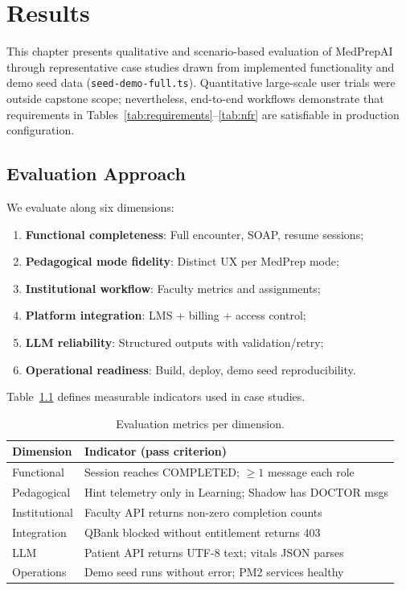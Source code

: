 \chapter{Results}
\label{ch:results}

This chapter presents qualitative and scenario-based evaluation of MedPrepAI through representative case studies drawn from implemented functionality and demo seed data (\texttt{seed-demo-full.ts}). Quantitative large-scale user trials were outside capstone scope; nevertheless, end-to-end workflows demonstrate that requirements in Tables~\ref{tab:requirements}--\ref{tab:nfr} are satisfiable in production configuration.

\section{Evaluation Approach}
We evaluate along six dimensions:
\begin{enumerate}
  \item \textbf{Functional completeness}: Full encounter, SOAP, resume sessions;
  \item \textbf{Pedagogical mode fidelity}: Distinct UX per MedPrep mode;
  \item \textbf{Institutional workflow}: Faculty metrics and assignments;
  \item \textbf{Platform integration}: LMS + billing + access control;
  \item \textbf{LLM reliability}: Structured outputs with validation/retry;
  \item \textbf{Operational readiness}: Build, deploy, demo seed reproducibility.
\end{enumerate}

Table~\ref{tab:eval-metrics} defines measurable indicators used in case studies.

\begin{table}[htbp]
  \centering
  \caption{Evaluation metrics per dimension.}
  \label{tab:eval-metrics}
  \small
  \begin{tabular}{@{}p{3.5cm}p{9.5cm}@{}}
    \toprule
    \textbf{Dimension} & \textbf{Indicator (pass criterion)} \\
    \midrule
    Functional & Session reaches COMPLETED; $\geq 1$ message each role \\
    Pedagogical & Hint telemetry only in Learning; Shadow has DOCTOR msgs \\
    Institutional & Faculty API returns non-zero completion counts \\
    Integration & QBank blocked without entitlement returns 403 \\
    LLM & Patient API returns UTF-8 text; vitals JSON parses \\
    Operations & Demo seed runs without error; PM2 services healthy \\
    \bottomrule
  \end{tabular}
\end{table}

